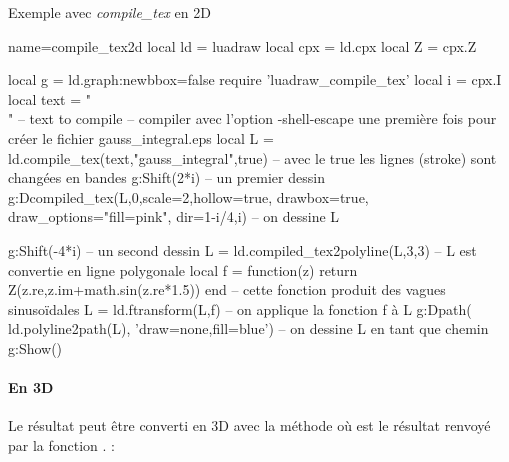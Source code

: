 \begin{demo}{Exemple avec \emph{compile\_tex} en 2D}
\begin{luadraw}{name=compile_tex2d}
local ld = luadraw
local cpx = ld.cpx
local Z = cpx.Z

local g = ld.graph:new{bbox=false}
require 'luadraw_compile_tex'
local i = cpx.I
local text = "\\[\\int_0^{+\\infty} e^{-\\frac{x^2}2}dx = \\frac{\\sqrt{2\\pi}}2\\]" -- text to compile
-- compiler avec l'option -shell-escape une première fois pour créer le fichier gauss_integral.eps 
local L = ld.compile_tex(text,"gauss_integral",true) -- avec le true les lignes (stroke) sont changées en bandes
g:Shift(2*i) -- un premier dessin
g:Dcompiled_tex(L,0,{scale=2,hollow=true, drawbox=true, draw_options="fill=pink", dir={1-i/4,i}}) -- on dessine L

g:Shift(-4*i) -- un second dessin
L = ld.compiled_tex2polyline(L,{3,3}) -- L est convertie en ligne polygonale
local f = function(z) return Z(z.re,z.im+math.sin(z.re*1.5)) end  -- cette fonction produit des vagues sinusoïdales
L = ld.ftransform(L,f) -- on applique la fonction f à L
g:Dpath( ld.polyline2path(L), 'draw=none,fill=blue') -- on dessine L en tant que chemin
g:Show()
\end{luadraw}
\end{demo}


\paragraph{En 3D} Le résultat peut être converti en 3D avec la méthode  où  est le résultat renvoyé par la fonction . \writeoptions :

